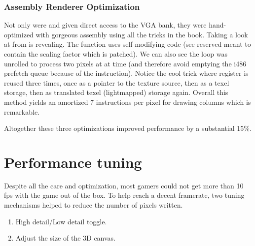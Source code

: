 \vspace{-10pt}
\subsubsection{Assembly Renderer Optimization}
Not only were  and  given direct access to the VGA bank, they were hand-optimized with gorgeous assembly using all the tricks in the book. Taking a look at  from  is revealing. The function uses self-modifying code (see reserved  meant to contain the scaling factor which is patched). We can also see the loop was unrolled to process two pixels at at time (and therefore avoid emptying the i486 prefetch queue because of the  instruction). Notice the cool trick where register  is reused three times, once as a pointer to the texture source, then as a  texel storage, then as  translated texel (lightmapped) storage again. Overall this method yields an amortized 7 instructions per pixel for drawing columns which is remarkable.\\
\par
Altogether these three optimizations improved performance by a substantial 15\%.







\vspace{-1.25cm}
\section{Performance tuning}
Despite all the care and optimization, most gamers could not get more than 10 fps with the game out of the box. To help reach a decent framerate, two tuning mechanisms helped to reduce the number of pixels written.
\begin{enumerate}
\item High detail/Low detail toggle.
\item Adjust the size of the 3D canvas.
\end{enumerate}
\par
{}\\
\par



